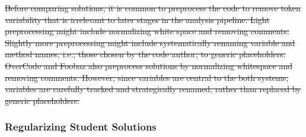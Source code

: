 \documentclass[12pt,twoside]{mitthesis}
\providecommand{\DIFdeltex}[1]{{\protect\color{red}\sout{#1}}}                      %
\providecommand{\DIFaddbegin}{} %
\providecommand{\DIFaddend}{} %
\providecommand{\DIFdelbegin}{} %
\providecommand{\DIFdelend}{} %
\providecommand{\DIFdel}[1]{\texorpdfstring{\DIFdeltex{#1}}{}} %
\begin{document}
{{{{{{{{{{%

\DIFdelbegin %
\DIFdel{Before comparing solutions, it is common to preprocess the code to remove token variability that is irrelevant to later stages in the analysis pipeline. Light preprocessing might include normalizing white space and removing comments. Slightly more preprocessing might include systematically renaming variable and method names, i.e., those chosen by the code author, to generic placeholders. OverCode and Foobaz also preprocess solutions by normalizing whitespace and removing comments. However, since variables are central to the both systems, variables are carefully tracked and strategically renamed, rather than replaced by generic placeholders.
}\DIFdelend %

\DIFaddbegin \subsubsection{Regularizing Student Solutions}
\DIFaddend 

}}}}}}}}}}
\end{document}
